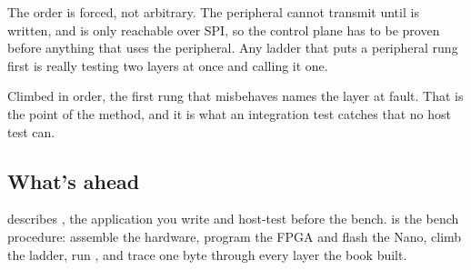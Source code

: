 The order is forced, not arbitrary. The peripheral cannot transmit until  is written,
and  is only reachable over SPI, so the control plane has to be proven before
anything that uses the peripheral. Any ladder that puts a peripheral rung first is really testing two
layers at once and calling it one.

Climbed in order, the first rung that misbehaves names the layer at fault. That is the point of the
method, and it is what an integration test catches that no host test can.

\subsection{What's ahead}
 describes , the application you write and host-test
before the bench.  is the bench procedure: assemble the hardware, program
the FPGA and flash the Nano, climb the ladder, run , and trace one byte through
every layer the book built.
